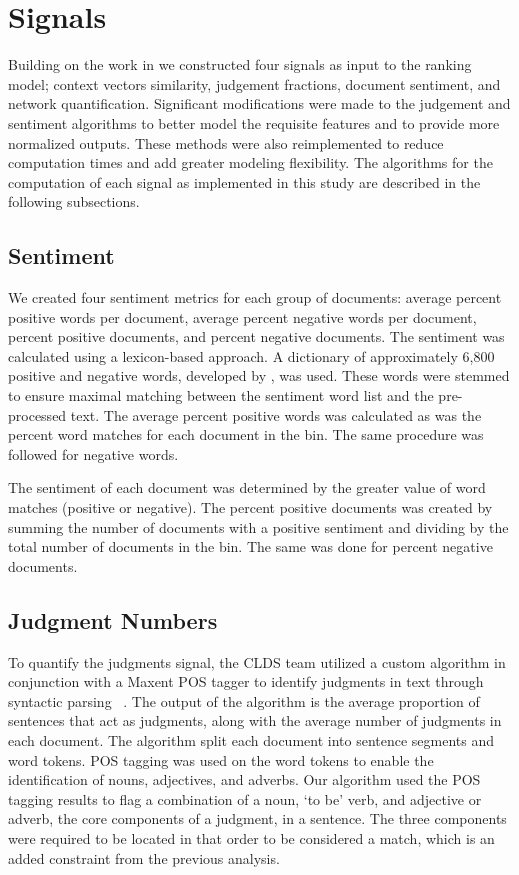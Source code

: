 \documentclass[11pt, a4paper]{article}
\begin{document}
\section{Signals}\label{signals}

Building on the work in  we constructed four signals as input to the ranking model; context vectors similarity, judgement fractions, document sentiment, and network quantification. Significant modifications were made to the judgement and sentiment algorithms to better model the requisite features and to provide more normalized outputs. These methods were also reimplemented to reduce computation times and add greater modeling flexibility. The algorithms for the computation of each signal as implemented in this study are described in the following subsections.

\subsection{Sentiment}

We created four sentiment metrics for each group of documents: average percent positive words per document, average percent negative words per document, percent positive documents, and percent negative documents. The sentiment was calculated using a lexicon-based approach. A dictionary of approximately 6,800 positive and negative words, developed by , was used. These words were stemmed to ensure maximal matching between the sentiment word list and the pre-processed text. The average percent positive words was calculated as was the percent word matches for each document in the bin. The same procedure was followed for negative words. 

The sentiment of each document was determined by the greater value of word matches (positive or negative). The percent positive documents was created by summing the number of documents with a positive sentiment and dividing by the total number of documents in the bin. The same was done for percent negative documents.

\subsection{Judgment Numbers}\label{subsec:judgment}

To quantify the judgments signal, the CLDS team utilized a custom algorithm in conjunction with a Maxent POS tagger to identify judgments in text through syntactic parsing ~\cite{Hornik2011}. The output of the algorithm is the average proportion of sentences that act as judgments, along with the average number of judgments in each document. The algorithm split each document into sentence segments and word tokens. POS tagging was used on the word tokens to enable the identification of nouns, adjectives, and adverbs. Our algorithm used the POS tagging results to flag a combination of a noun, `to be' verb, and adjective or adverb, the core components of a judgment, in a sentence. The three components were required to be located in that order to be considered a match, which is an added constraint from the previous analysis.  
\end{document}
